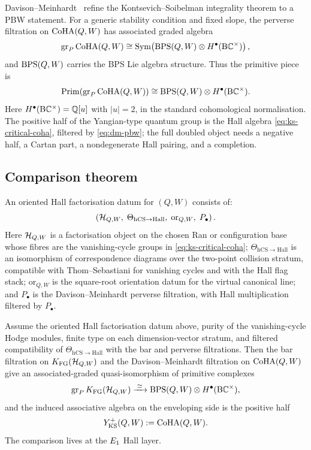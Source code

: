 Davison--Meinhardt~\cite{DM2020} refine the Kontsevich--Soibelman integrality
theorem to a PBW statement. For a generic stability condition and fixed slope,
the perverse filtration on $\mathrm{CoHA}(Q,W)$ has associated graded algebra
\begin{equation}
\label{eq:dm-pbw}
\operatorname{gr}_{P}\mathrm{CoHA}(Q,W)
\cong
\operatorname{Sym}\!\left(
\mathrm{BPS}(Q,W)\otimes H^\bullet(\mathrm{B}\mathbb{C}^\times)
\right),
\end{equation}
and $\mathrm{BPS}(Q,W)$ carries the BPS Lie algebra structure. Thus the primitive
piece is
\begin{equation}
\label{eq:dm-primitives}
\mathrm{Prim}\!\left(\operatorname{gr}_{P}\mathrm{CoHA}(Q,W)\right)
\cong
\mathrm{BPS}(Q,W)\otimes H^\bullet(\mathrm{B}\mathbb{C}^\times).
\end{equation}
Here $H^\bullet(\mathrm{B}\mathbb{C}^\times)=\mathbb{Q}[u]$ with $|u|=2$, in the
standard cohomological normalisation.
The positive half of the Yangian-type quantum group is the Hall algebra
\eqref{eq:ks-critical-coha}, filtered by \eqref{eq:dm-pbw}; the full doubled
object needs a negative half, a Cartan part, a nondegenerate Hall pairing, and a
completion.

\subsection{Comparison theorem}
\label{subsec:comparison-theorem}

An oriented Hall factorisation datum for $(Q,W)$ consists of:
\[
\left(
\mathcal{H}_{Q,W},\;
\Theta_{\mathrm{hCS}\to\mathrm{Hall}},\;
\mathrm{or}_{Q,W},\;
P_\bullet
\right).
\]
Here $\mathcal{H}_{Q,W}$ is a factorisation object on the chosen Ran or configuration
base whose fibres are the vanishing-cycle groups in \eqref{eq:ks-critical-coha};
$\Theta_{\mathrm{hCS}\to\mathrm{Hall}}$ is an isomorphism of correspondence
diagrams over the two-point collision stratum, compatible with
Thom--Sebastiani for vanishing cycles and with the Hall flag stack;
$\mathrm{or}_{Q,W}$ is the square-root orientation datum for the virtual
canonical line; and $P_\bullet$ is the Davison--Meinhardt perverse filtration,
with Hall multiplication filtered by $P_\bullet$.

\begin{proposition}
\label{prop:koszul-hall-primitive-comparison}
Assume the oriented Hall factorisation datum above, purity of the
vanishing-cycle Hodge modules, finite type on each dimension-vector stratum,
and filtered compatibility of $\Theta_{\mathrm{hCS}\to\mathrm{Hall}}$ with the
bar and perverse filtrations. Then the bar filtration on
$K_{\mathrm{FG}}(\mathcal{H}_{Q,W})$ and the Davison--Meinhardt filtration on
$\mathrm{CoHA}(Q,W)$ give an associated-graded quasi-isomorphism of primitive complexes
\begin{equation}
\label{eq:koszul-hall-comparison}
\operatorname{gr}_{P}K_{\mathrm{FG}}(\mathcal{H}_{Q,W})
\xrightarrow{\;\simeq\;}
\mathrm{BPS}(Q,W)\otimes H^\bullet(\mathrm{B}\mathbb{C}^\times),
\end{equation}
and the induced associative algebra on the enveloping side is the positive half
\[
 Y^{+}_{\mathrm{KS}}(Q,W):=\mathrm{CoHA}(Q,W).
\]
The comparison lives at the $E_{1}$ Hall layer.
\end{proposition}

